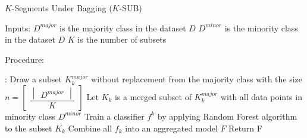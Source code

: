 \begin{algorithm}[h]
\caption{$K$-Segments Under Bagging ($K$-SUB)}
\label{alg:ksus}

Inputs:
\newline
$D^{major}$ is the majority class in the dataset $D$
\newline
$D^{minor}$ is the minority class in the dataset $D$
\newline
$K$ is the number of subsets

Procedure:
\begin{algorithmic}[1]
:
  \State Draw a subset $K^{major}_k$ without replacement from the majority class with the size $n = \begin{bmatrix} \dfrac{ \begin{vmatrix} D^{major} \end{vmatrix} }{ K } \end{bmatrix}$
  \State Let $K_k$ is a merged subset of $K^{major}_k$ with all data points in minority class $D^{minor}$
  \State Train a classifier $f^k$ by applying Random Forest algorithm to the subset $K_k$
\EndFor
\State Combine all $f_k$ into an aggregated model $F$
\State Return F
\end{algorithmic}


\end{algorithm}


